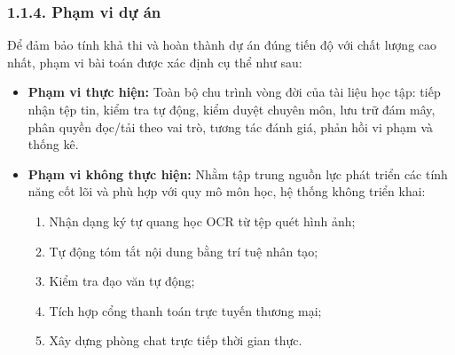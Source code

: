 \subsubsection{1.1.4. Phạm vi dự án}
Để đảm bảo tính khả thi và hoàn thành dự án đúng tiến độ với chất lượng cao nhất, phạm vi bài toán được xác định cụ thể như sau:
\begin{itemize}[leftmargin=*,noitemsep]
    \item \textbf{Phạm vi thực hiện:} Toàn bộ chu trình vòng đời của tài liệu học tập: tiếp nhận tệp tin, kiểm tra tự động, kiểm duyệt chuyên môn, lưu trữ đám mây, phân quyền đọc/tải theo vai trò, tương tác đánh giá, phản hồi vi phạm và thống kê.
    \item \textbf{Phạm vi không thực hiện:} Nhằm tập trung nguồn lực phát triển các tính năng cốt lõi và phù hợp với quy mô môn học, hệ thống không triển khai:
    \begin{enumerate}[label=(\arabic*),leftmargin=*,noitemsep]
        \item Nhận dạng ký tự quang học OCR từ tệp quét hình ảnh;
        \item Tự động tóm tắt nội dung bằng trí tuệ nhân tạo;
        \item Kiểm tra đạo văn tự động;
        \item Tích hợp cổng thanh toán trực tuyến thương mại;
        \item Xây dựng phòng chat trực tiếp thời gian thực.
    \end{enumerate}
\end{itemize}
